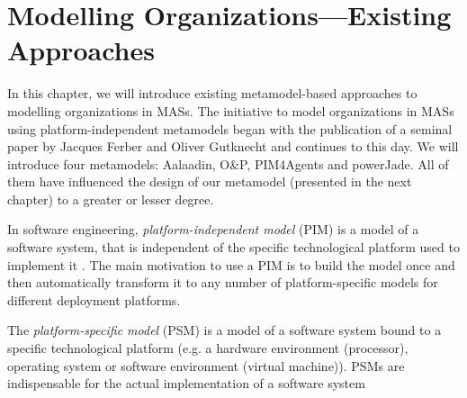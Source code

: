 
\chapter{Modelling Organizations---Existing Approaches}

In this chapter, we will introduce existing metamodel-based approaches to modelling organizations in MASs.
The initiative to model organizations in MASs using platform-independent metamodels began with the publication of a seminal paper \cite{Ferber98} by Jacques Ferber and Oliver Gutknecht and continues to this day.
We will introduce four metamodels: Aalaadin, O\&P, PIM4Agents and powerJade.
All of them have influenced the design of our metamodel (presented in the next chapter) to a greater or lesser degree.

In software engineering, \textit{platform-independent model} (PIM) is a model of a software system, that is independent of the specific technological platform used to implement it \cite{Wikipedia-PIM}.
The main motivation to use a PIM is to build the model once and then automatically transform it to any number of platform-specific models for different deployment platforms.

The \textit{platform-specific model} (PSM) is a model of a software system bound to a specific technological platform (e.g. a hardware environment (processor), operating system or software environment (virtual machine)).
PSMs are indispensable for the actual implementation of a software system \cite{Wikipedia-PSM}

